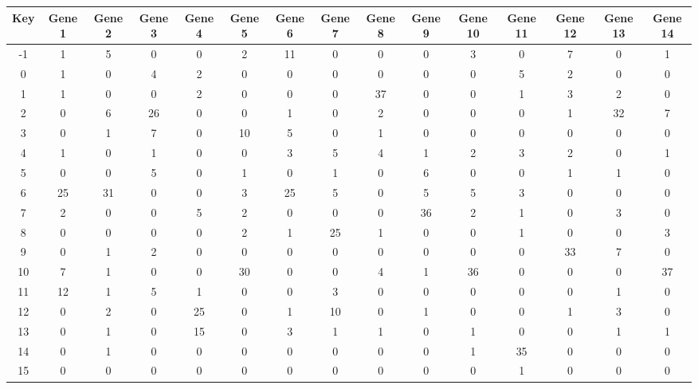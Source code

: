 \begin{tabular}{|c|c|c|c|c|c|c|c|c|c|c|c|c|c|c|}
\hline
Key & Gene 1 & Gene 2 & Gene 3 & Gene 4 & Gene 5 & Gene 6 & Gene 7 & Gene 8 & Gene 9 & Gene 10 & Gene 11 & Gene 12 & Gene 13 & Gene 14 \\
\hline
-1 & 1 & 5 & 0 & 0 & 2 & 11 & 0 & 0 & 0 & 3 & 0 & 7 & 0 & 1 \\
0 & 1 & 0 & 4 & 2 & 0 & 0 & 0 & 0 & 0 & 0 & 5 & 2 & 0 & 0 \\
1 & 1 & 0 & 0 & 2 & 0 & 0 & 0 & 37 & 0 & 0 & 1 & 3 & 2 & 0 \\
2 & 0 & 6 & 26 & 0 & 0 & 1 & 0 & 2 & 0 & 0 & 0 & 1 & 32 & 7 \\
3 & 0 & 1 & 7 & 0 & 10 & 5 & 0 & 1 & 0 & 0 & 0 & 0 & 0 & 0 \\
4 & 1 & 0 & 1 & 0 & 0 & 3 & 5 & 4 & 1 & 2 & 3 & 2 & 0 & 1 \\
5 & 0 & 0 & 5 & 0 & 1 & 0 & 1 & 0 & 6 & 0 & 0 & 1 & 1 & 0 \\
6 & 25 & 31 & 0 & 0 & 3 & 25 & 5 & 0 & 5 & 5 & 3 & 0 & 0 & 0 \\
7 & 2 & 0 & 0 & 5 & 2 & 0 & 0 & 0 & 36 & 2 & 1 & 0 & 3 & 0 \\
8 & 0 & 0 & 0 & 0 & 2 & 1 & 25 & 1 & 0 & 0 & 1 & 0 & 0 & 3 \\
9 & 0 & 1 & 2 & 0 & 0 & 0 & 0 & 0 & 0 & 0 & 0 & 33 & 7 & 0 \\
10 & 7 & 1 & 0 & 0 & 30 & 0 & 0 & 4 & 1 & 36 & 0 & 0 & 0 & 37 \\
11 & 12 & 1 & 5 & 1 & 0 & 0 & 3 & 0 & 0 & 0 & 0 & 0 & 1 & 0 \\
12 & 0 & 2 & 0 & 25 & 0 & 1 & 10 & 0 & 1 & 0 & 0 & 1 & 3 & 0 \\
13 & 0 & 1 & 0 & 15 & 0 & 3 & 1 & 1 & 0 & 1 & 0 & 0 & 1 & 1 \\
14 & 0 & 1 & 0 & 0 & 0 & 0 & 0 & 0 & 0 & 1 & 35 & 0 & 0 & 0 \\
15 & 0 & 0 & 0 & 0 & 0 & 0 & 0 & 0 & 0 & 0 & 1 & 0 & 0 & 0 \\
\hline
\end{tabular}